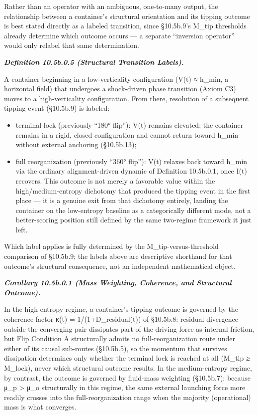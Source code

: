 \documentclass[
]{article}
\begin{document}
Rather than an operator with an ambiguous, one-to-many output, the
relationship between a container's structural orientation and its
tipping outcome is best stated directly as a labeled transition, since
§10.5b.9's M\_tip thresholds already determine which outcome occurs ---
a separate ``inversion operator'' would only relabel that same
determination.

\emph{\textbf{Definition 10.5b.0.5 (Structural Transition Labels).}}

A container beginning in a low-verticality configuration (V(t) ≈ h\_min,
a horizontal field) that undergoes a shock-driven phase transition
(Axiom C3) moves to a high-verticality configuration. From there,
resolution of a subsequent tipping event (§10.5b.9) is labeled:

\begin{itemize}
\item
  terminal lock (previously ``180° flip''): V(t) remains elevated; the
  container remains in a rigid, closed configuration and cannot return
  toward h\_min without external anchoring (§10.5b.13);
\item
  full reorganization (previously ``360° flip''): V(t) relaxes back
  toward h\_min via the ordinary alignment-driven dynamic of Definition
  10.5b.0.1, once I(t) recovers. This outcome is not merely a favorable
  value within the high/medium-entropy dichotomy that produced the
  tipping event in the first place --- it is a genuine exit from that
  dichotomy entirely, landing the container on the low-entropy baseline
  as a categorically different mode, not a better-scoring position still
  defined by the same two-regime framework it just left.
\end{itemize}

Which label applies is fully determined by the M\_tip-versus-threshold
comparison of §10.5b.9; the labels above are descriptive shorthand for
that outcome's structural consequence, not an independent mathematical
object.

\emph{\textbf{Corollary 10.5b.0.1 (Mass Weighting, Coherence, and
Structural Outcome).}}

In the high-entropy regime, a container's tipping outcome is governed by
the coherence factor κ(t) = 1/(1+D\_residual(t)) of §10.5b.8: residual
divergence outside the converging pair dissipates part of the driving
force as internal friction, but Flip Condition A structurally admits no
full-reorganization route under either of its causal sub-routes
(§10.5b.5), so the momentum that survives dissipation determines only
whether the terminal lock is reached at all (M\_tip ≥ M\_lock), never
which structural outcome results. In the medium-entropy regime, by
contrast, the outcome is governed by fluid-mass weighting (§10.5b.7):
because μ\_p \textgreater{} μ\_o structurally in this regime, the same
external launching force more readily crosses into the
full-reorganization range when the majority (operational) mass is what
converges.
\end{document}
